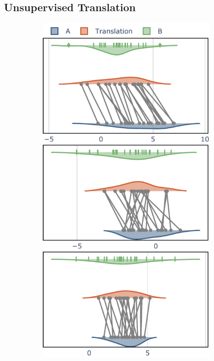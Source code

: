 \documentclass[nohyperref]{article}
\theoremstyle{plain}
\theoremstyle{definition}
\theoremstyle{remark}
\begin{document}
\subsection{Unsupervised Translation}

\begin{figure}[t]
    \vskip 0.2in
    \begin{center}
\begin{subfigure}{0.49\columnwidth}
    \includegraphics[width=\textwidth]{files/trans_ours.pdf}

\end{subfigure}
\end{center}
\end{figure}
\end{document}
